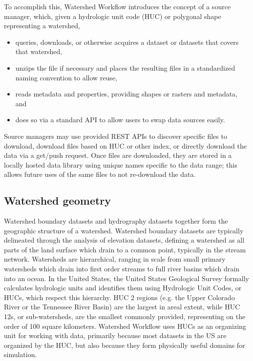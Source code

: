 \documentclass[a4paper,fleqn]{cas-dc}
\begin{document}
To accomplish this, Watershed Workflow introduces the concept of a source manager, which, given a hydrologic unit code (HUC) or polygonal shape representing a watershed,
%
\begin{itemize}
\item queries, downloads, or otherwise acquires a dataset or datasets that covers that watershed,
\item unzips the file if necessary and places the resulting files in a standardized naming convention to allow reuse,  
\item reads metadata and properties, providing shapes or rasters and metadata, and
\item does so via a standard API to allow users to swap data sources easily.
\end{itemize}
%
Source managers may use provided REST APIs to discover specific files to download, download files based on HUC or other index, or directly download the data via a get/push request.
Once files are downloaded, they are stored in a locally hosted data library using unique names specific to the data range; this allows future uses of the same files to not re-download the data.


\subsection{Watershed geometry}\label{ssc:acquisition:geom}
%
Watershed boundary datasets and hydrography datasets together form the geographic structure of a watershed.
Watershed boundary datasets are typically delineated through the analysis of elevation datasets, defining a watershed as all parts of the land surface which drain to a common point, typically in the stream network.
Watersheds are hierarchical, ranging in scale from small primary watersheds which drain into first order streams to full river basins which drain into an ocean.
In the United States, the United States Geological Survey formally calculates hydrologic units and identifies them using Hydrologic Unit Codes, or HUCs, which respect this hierarchy.
HUC 2 regions (e.g. the Upper Colorado River or the Tennessee River Basin) are the largest in areal extent, while HUC 12s, or sub-watersheds, are the smallest commonly provided, representing on the order of 100 square kilometers.
Watershed Workflow uses HUCs as an organizing unit for working with data, primarily because most datasets in the US are organized by the HUC, but also because they form physically useful domains for simulation.
\end{document}
